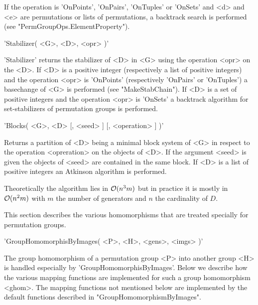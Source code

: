 If the operation is 'OnPoints', 'OnPairs', 'OnTuples' or 'OnSets' and <d>
and <e> are permutations or lists of  permutations, a backtrack search is
performed (see "PermGroupOps.ElementProperty").

\vspace{5mm}
'Stabilizer( <G>, <D>, <opr> )'%

'Stabilizer'  returns the stabilizer of  <D>  in <G> using the  operation
<opr> on the <D>.  If <D> is a positive  integer (respectively  a list of
positive  integers) and the  operation  <opr> is 'OnPoints' (respectively
'OnPairs'   or  'OnTuples')  a  basechange  of  <G>   is  performed  (see
"MakeStabChain").  If <D> is a set of positive integers and the operation
<opr>   is  'OnSets'   a  backtrack  algorithm   for  set-stabilizers  of
permutation groups is performed.

\vspace{5mm}
'Blocks( <G>, <D> [, <seed> ] [, <operation> ] )'%

Returns a partition of <D> being a minimal block system of <G> in respect
to the  operation <opreration> on the objects  of  <D>.  If  the argument
<seed> is given the objects of  <seed>  are contained in  the same block.
If <D> is a list of positive integers an Atkinson algorithm is performed.

Theoretically the algorithm lies in ${\cal{O}}(n^3 m)$ but in practice it
is mostly in ${\cal{O}}(n^2 m)$ with $m$ the number of generators and $n$
the cardinality of $D$.


This  section  describes  the  various  homomorphisms  that  are  treated
specially for permutation groups.

\vspace{7mm}
'GroupHomomorphisByImages( <P>, <H>, <gens>, <imgs> )'%

The group homomorphism of  a permutation group <P> into another group <H>
is handled especially  by 'GroupHomomorphisByImages'.  Below we  describe
how the  various  mapping  functions  are implemented  for  such a  group
homomorphism <ghom>.   The mapping  functions  not  mentioned  below  are
implemented     by     the     default     functions     described     in
"GroupHomomorphismByImages".

